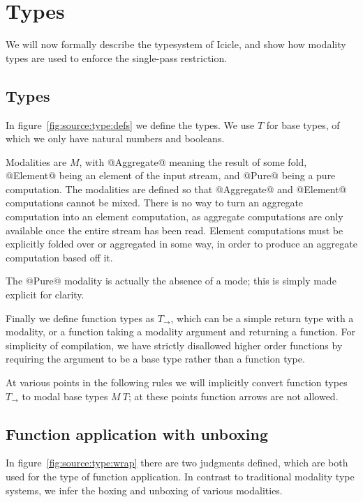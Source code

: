 \section{Types}
\label{s:Types}

We will now formally describe the typesystem of Icicle, and show how modality types are used to enforce the single-pass restriction.



\subsection{Types}
In figure~\ref{fig:source:type:defs} we define the types.
We use $T$ for base types, of which we only have natural numbers and booleans.

Modalities are $M$, with @Aggregate@ meaning the result of some fold, @Element@ being an element of the input stream, and @Pure@ being a pure computation.
The modalities are defined so that @Aggregate@ and @Element@ computations cannot be mixed.
There is no way to turn an aggregate computation into an element computation, as aggregate computations are only available once the entire stream has been read.
Element computations must be explicitly folded over or aggregated in some way, in order to produce an aggregate computation based off it.

The @Pure@ modality is actually the absence of a mode; this is simply made explicit for clarity.

Finally we define function types as $T_\to$, which can be a simple return type with a modality, or a function taking a modality argument and returning a function.
For simplicity of compilation, we have strictly disallowed higher order functions by requiring the argument to be a base type rather than a function type.

At various points in the following rules we will implicitly convert function types $T_\to$ to modal base types $M~T$; at these points function arrows are not allowed.



\subsection{Function application with unboxing}
In figure~\ref{fig:source:type:wrap} there are two judgments defined, which are both used for the type of function application.
In contrast to traditional modality type systems, we infer the boxing and unboxing of various modalities.

